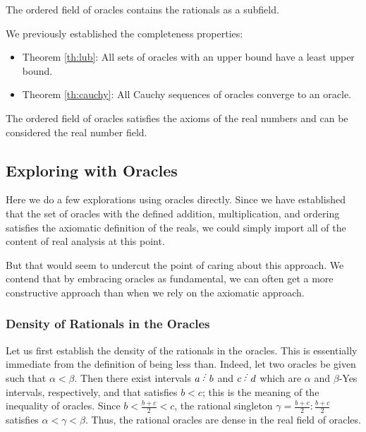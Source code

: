 \documentclass[12pt]{article}
\begin{document}
\begin{theorem}
The ordered field of oracles contains the rationals as a subfield. 
\end{theorem}

We previously established the completeness properties:

\begin{itemize}
    \item  Theorem \ref{th:lub}: All sets of oracles with an upper bound have a least upper bound. 
    \item Theorem \ref{th:cauchy}: All Cauchy sequences of oracles converge to an oracle. 
\end{itemize}

\begin{theorem}
The ordered field of oracles satisfies the axioms of the real numbers and can be considered the real number field. 
\end{theorem}

\subsection{Exploring with Oracles}

Here we do a few explorations using oracles directly. Since we have established that the set of oracles with the defined addition, multiplication, and ordering satisfies the axiomatic definition of the reals, we could simply import all of the content of real analysis at this point. 

But that would seem to undercut the point of caring about this approach. We contend that by embracing oracles as fundamental, we can often get a more constructive approach than when we rely on the axiomatic approach. 

\subsubsection{Density of Rationals in the Oracles}

Let us first establish the density of the rationals in the oracles. This is essentially immediate from the definition of being less than. Indeed, let two oracles be given such that $\alpha < \beta$. Then there exist intervals $a\lte b$ and $c\lte d$ which are $\alpha$ and $\beta$-Yes intervals, respectively, and that satisfies $b < c$; this is the meaning of the inequality of oracles. Since $b < \frac{b+c}{2} < c$, the rational singleton $\gamma = \frac{b+c}{2}:\frac{b+c}{2}$ satisfies $\alpha < \gamma < \beta$. Thus, the rational oracles are dense in the real field of oracles. 
\end{document}
